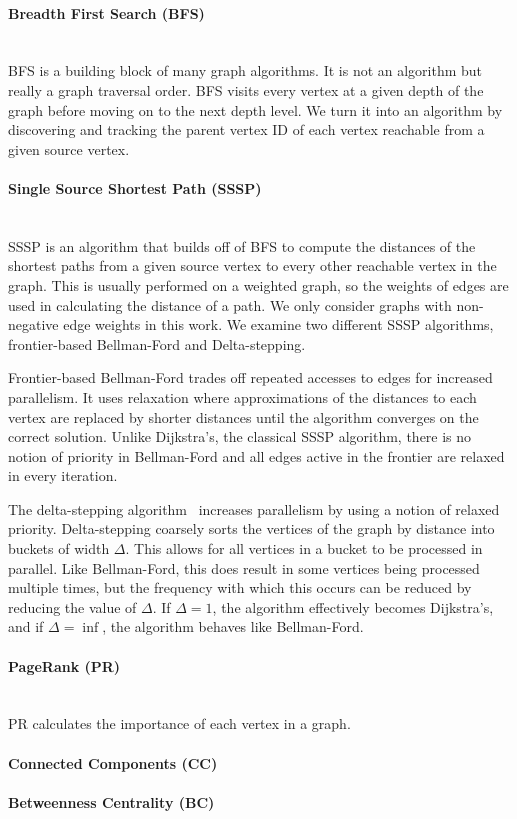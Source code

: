 \paragraph{Breadth First Search (BFS)}\mbox{}\\
BFS is a building block of many graph algorithms. 
It is not an algorithm but really a graph traversal order. 
BFS visits every vertex at a given depth of the graph before moving on to the next depth level.
We turn it into an algorithm by discovering and tracking the parent vertex ID of each vertex reachable from a given source vertex.

\paragraph{Single Source Shortest Path (SSSP)}\mbox{}\\
SSSP is an algorithm that builds off of BFS to compute the distances of the shortest paths from a given source vertex to every other reachable vertex in the graph.
This is usually performed on a weighted graph, so the weights of edges are used in calculating the distance of a path.
We only consider graphs with non-negative edge weights in this work.
We examine two different SSSP algorithms, frontier-based Bellman-Ford and Delta-stepping.

Frontier-based Bellman-Ford trades off repeated accesses to edges for increased parallelism. 
It uses relaxation where approximations of the distances to each vertex are replaced by shorter distances until the algorithm converges on the correct solution.
Unlike Dijkstra's, the classical SSSP algorithm, there is no notion of priority in Bellman-Ford and all edges active in the frontier are relaxed in every iteration.

The delta-stepping algorithm~\cite{meyer2003delta} increases parallelism by using a notion of relaxed priority. 
Delta-stepping coarsely sorts the vertices of the graph by distance into buckets of width $\Delta$.
This allows for all vertices in a bucket to be processed in parallel. 
Like Bellman-Ford, this does result in some vertices being processed multiple times, but the frequency with which this occurs can be reduced by reducing the value of $\Delta$.
If $\Delta=1$, the algorithm effectively becomes Dijkstra's, and if $\Delta=\inf$, the algorithm behaves like Bellman-Ford. 

\paragraph{PageRank (PR)}\mbox{}\\
PR calculates the importance of each vertex in a graph. 

\paragraph{Connected Components (CC)}

\paragraph{Betweenness Centrality (BC)} 